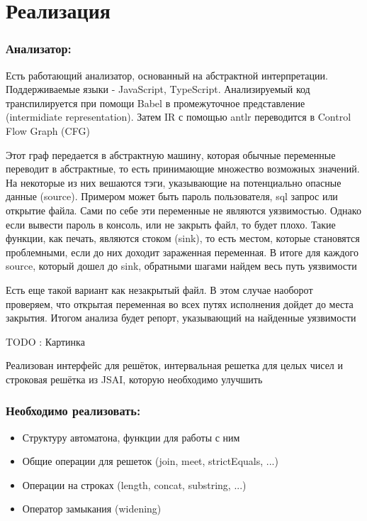 \section{Реализация}

\subsubsection*{Анализатор:}
Есть работающий анализатор, основанный на абстрактной интерпретации. Поддерживаемые языки - JavaScript, TypeScript. Анализируемый код транспилируется при помощи Babel в промежуточное представление (intermidiate representation). Затем IR с помощью antlr переводится в Control Flow Graph (CFG)

Этот граф передается в абстрактную машину, которая обычные переменные переводит в абстрактные, то есть принимающие множество возможных значений. На некоторые из них вешаются тэги, указывающие на потенциально опасные данные (source). Примером может быть пароль пользователя, sql запрос или открытие файла. Сами по себе эти переменные не являются уязвимостью. Однако если вывести пароль в консоль, или не закрыть файл, то будет плохо. Такие функции, как печать, являются стоком (sink), то есть местом, которые становятся проблемными, если до них доходит зараженная переменная. В итоге для каждого source, который дошел до sink, обратными шагами найдем весь путь уязвимости

Есть еще такой вариант как незакрытый файл. В этом случае наоборот проверяем, что открытая переменная во всех путях исполнения дойдет до места закрытия. Итогом анализа будет репорт, указывающий на найденные уязвимости

TODO : Картинка

Реализован интерфейс для решёток, интервальная решетка для целых чисел и строковая решётка из JSAI, которую необходимо улучшить



\newpage
\subsubsection*{Необходимо реализовать:}
\begin{itemize}
    \item Структуру автоматона, функции для работы с ним
    \item Общие операции для решеток (join, meet, strictEquals, ...)
    \item Операции на строках (length, concat, substring, ...)
    \item Оператор замыкания (widening)
\end{itemize}

